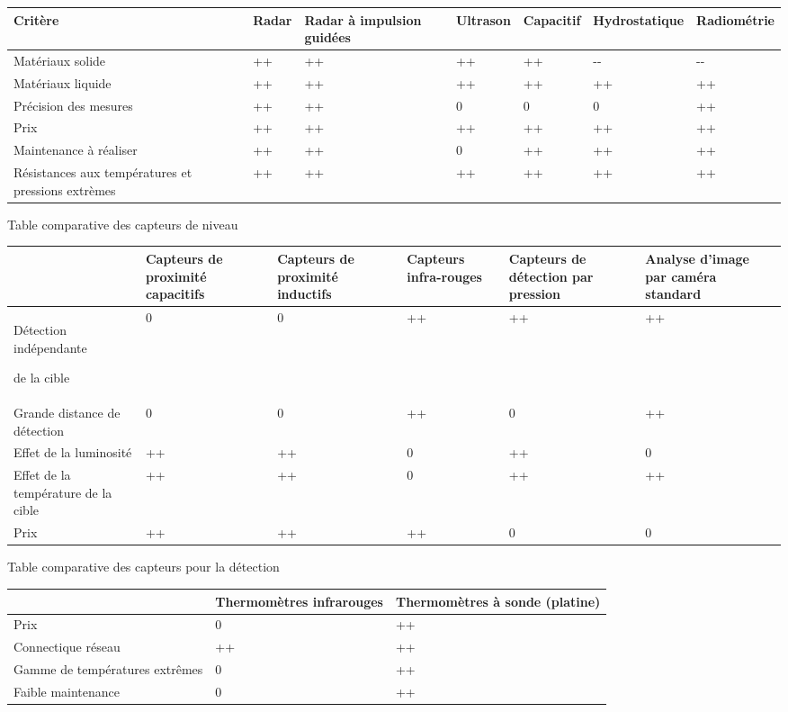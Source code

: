 \documentclass{article}
\begin{document}
\begin{flushleft}
\tablehead{}
\begin{supertabular}{|m{2.71cm}|m{1.308cm}|m{2.155cm}|m{1.8109999cm}|m{1.8369999cm}|m{2.816cm}|m{2.472cm}|}
\hline
Critère &
Radar &
Radar à impulsion guidées &
Ultrason &
Capacitif &
Hydrostatique &
Radiométrie\\\hline
Matériaux solide &
++ &
++ &
++ &
++ &
{}-{}- &
{}-{}-\\\hline
Matériaux liquide &
++ &
++ &
++ &
++ &
++ &
++\\\hline
Précision des mesures &
++ &
++ &
0 &
0 &
0 &
++\\\hline
Prix &
++ &
++ &
++ &
++ &
++ &
++\\\hline
Maintenance à réaliser &
++ &
++ &
0 &
++ &
++ &
++\\\hline
Résistances aux températures et pressions extrèmes &
++ &
++ &
++ &
++ &
++ &
++\\\hline
\end{supertabular}
\end{flushleft}



Table comparative des capteurs de niveau




\begin{flushleft}
\tablehead{}
\begin{supertabular}{|m{2.843cm}|m{2.261cm}|m{2.552cm}|m{2.552cm}|m{2.552cm}|m{2.552cm}|}
\hline
~
 &
Capteurs de proximité capacitifs &
Capteurs de proximité inductifs &
Capteurs infra-rouges &
Capteurs de détection par pression &
Analyse d’image par caméra standard\\\hline
Détection indépendante 

 de la cible &
0 &
0 &
++ &
++ &
++\\\hline
Grande distance de détection  &
0 &
0 &
++ &
0 &
++\\\hline
Effet de la luminosité &
++ &
++ &
0 &
++ &
0\\\hline
Effet de la température de la cible &
++ &
++ &
0 &
++ &
++\\\hline
Prix &
++ &
++ &
++ &
0 &
0\\\hline
\end{supertabular}
\end{flushleft}



Table comparative des capteurs pour la détection




\begin{flushleft}
\tablehead{}
\begin{supertabular}{|m{5.303cm}|m{5.303cm}|m{5.303cm}|}
\hline
~
 &
Thermomètres infrarouges &
Thermomètres à sonde (platine)\\\hline
Prix &
0 &
++\\\hline
Connectique réseau &
++ &
++\\\hline
Gamme de températures extrêmes &
0 &
++\\\hline
Faible maintenance &
0 &
++\\\hline
\end{supertabular}
\end{flushleft}
\end{document}
